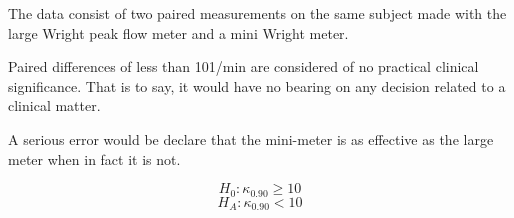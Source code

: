 The data consist of two paired measurements on the same subject made with the large Wright peak flow meter and a mini
Wright meter.

Paired differences of less than 101/min are considered of no practical clinical significance. That is to say, it would have no bearing on
any decision related to a clinical matter.

A serious error would be declare that the mini-meter is as effective as the large meter when in fact it is not.


\[ H_0 : \kappa_{0.90} \geq 10 \]
\[ H_A : \kappa_{0.90} < 10 \]


